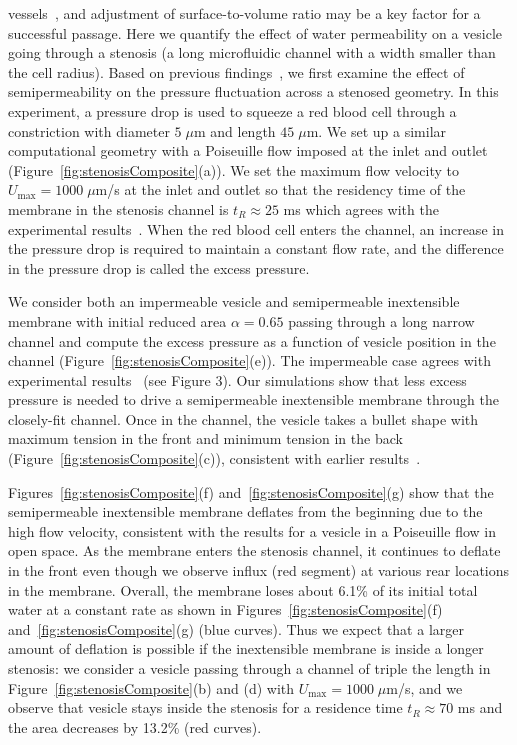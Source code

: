 \documentclass[prb,preprint,showpacs,preprintnumbers,amsmath,amssymb,longbibliography]{revtex4-1}
\begin{document}
vessels~\cite{AuStoreyMoore2016_PNAS}, and adjustment of
surface-to-volume ratio may be a key factor for a successful passage.
Here we quantify the effect of water permeability on a vesicle going
through a stenosis (a long microfluidic channel with a width smaller
than the cell radius). Based on previous
findings~\cite{abk-fai-sto2006}, we first examine the effect of
semipermeability on the pressure fluctuation across a stenosed geometry.
In this experiment, a pressure drop is used to squeeze a red blood cell
through a constriction with diameter $5\;\mu$m and length $45\;\mu$m. We
set up a similar computational geometry with a Poiseuille flow imposed
at the inlet and outlet (Figure~\ref{fig:stenosisComposite}(a)). We set
the maximum flow velocity to $U_{\max} = 1000 \;\mu$m/s at the inlet and
outlet so that the residency time of the membrane in the stenosis
channel is $t_R \approx 25$ ms which agrees with the experimental
results~\cite{abk-fai-sto2006}. When the red blood cell enters the
channel, an increase in the pressure drop is required to maintain a
constant flow rate, and the difference in the pressure drop is called
the excess pressure.

We consider both an impermeable vesicle and semipermeable inextensible
membrane with initial reduced area $\alpha = 0.65$ passing through a
long narrow channel and compute the excess pressure as a function of
vesicle position in the channel (Figure~\ref{fig:stenosisComposite}(e)).
The impermeable case agrees with experimental
results~\cite{abk-fai-sto2006} (see Figure 3). Our simulations show that
less excess pressure is needed to drive a semipermeable inextensible
membrane through the closely-fit channel. Once in the channel, the
vesicle takes a bullet shape with maximum tension in the front and
minimum tension in the back (Figure~\ref{fig:stenosisComposite}(c)),
consistent with earlier results~\cite{Pak2015_PNAS,
HarmanBertrandJoos2017_CJP}.

Figures~\ref{fig:stenosisComposite}(f)
and~\ref{fig:stenosisComposite}(g) show that the semipermeable
inextensible membrane deflates from the beginning due to the high flow
velocity, consistent with the results for a vesicle in a Poiseuille flow
in open space. As the membrane enters the stenosis channel, it continues
to deflate in the front even though we observe influx (red segment) at
various rear locations in the membrane. Overall, the membrane loses
about 6.1\% of its initial total water at a constant rate as shown in
Figures~\ref{fig:stenosisComposite}(f)
and~\ref{fig:stenosisComposite}(g) (blue curves). Thus we expect that a
larger amount of deflation is possible if the inextensible membrane is
inside a longer stenosis: we consider a vesicle passing through a
channel of triple the length in Figure~\ref{fig:stenosisComposite}(b)
and (d) with $U_{\max}=1000\;\mu$m/s, and we observe that vesicle stays
inside the stenosis for a residence time $t_R \approx 70$ ms and the
area decreases by 13.2\% (red curves).
\end{document}
